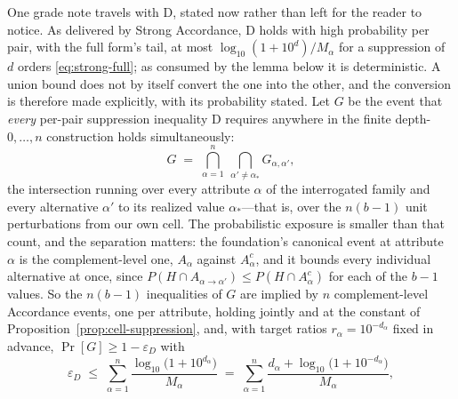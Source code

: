 \documentclass[11pt]{article}
\theoremstyle{definition}
\begin{document}
One grade note travels with D, stated now rather than left for the reader to notice. As delivered by Strong Accordance, D holds with high probability per pair, with the full form's tail, at most $\log_{10}(1 + 10^{d})/M_\alpha$ for a suppression of $d$ orders \eqref{eq:strong-full}; as consumed by the lemma below it is deterministic. A union bound does not by itself convert the one into the other, and the conversion is therefore made explicitly, with its probability stated. Let $G$ be the event that \emph{every} per-pair suppression inequality D requires anywhere in the finite depth-$0,\dots,n$ construction holds simultaneously:
\begin{equation}
\label{eq:eventG}
G \;=\; \bigcap_{\alpha = 1}^{n} \ \bigcap_{\alpha' \ne \alpha_{\ast}} G_{\alpha, \alpha'},
\end{equation}
the intersection running over every attribute $\alpha$ of the interrogated family and every alternative $\alpha'$ to its realized value $\alpha_{\ast}$---that is, over the $n(b-1)$ unit perturbations from our own cell. The probabilistic exposure is smaller than that count, and the separation matters: the foundation's canonical event at attribute $\alpha$ is the complement-level one, $A_\alpha$ against $A_\alpha^{c}$, and it bounds every individual alternative at once, since $P(H \cap A_{\alpha \to \alpha'}) \le P(H \cap A_\alpha^{c})$ for each of the $b-1$ values. So the $n(b-1)$ inequalities of $G$ are implied by $n$ complement-level Accordance events, one per attribute, holding jointly and at the constant of Proposition~\ref{prop:cell-suppression}, and, with target ratios $r_\alpha = 10^{-d_\alpha}$ fixed in advance, $\Pr[G] \ge 1 - \varepsilon_D$ with
\begin{equation}
\label{eq:epsD}
\varepsilon_D \;\le\; \sum_{\alpha=1}^{n} \frac{\log_{10}\big(1 + 10^{d_\alpha}\big)}{M_\alpha} \;=\; \sum_{\alpha=1}^{n} \frac{d_\alpha + \log_{10}\big(1 + 10^{-d_\alpha}\big)}{M_\alpha},
\end{equation}
\end{document}
